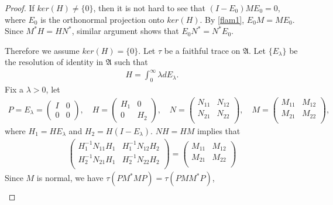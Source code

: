 \documentclass[a4paper,10pt]{amsart}
\newcommand{\AAA}{\mathfrak A}
\begin{document}
\begin{proof}
    If $ker(H) \neq \{0\}$, then it is not hard to see that 
    $(I-E_{0})ME_{0} = 0$, where $E_0$ is the orthonormal projection 
    onto $ker(H)$. 
    By \cref{flam1}, $E_{0}M = ME_{0}$. 
    Since $M^{*}H = HN^{*}$, similar argument shows
    that $E_{0}N^{*} = N^{*}E_{0}$.
    
    Therefore we assume $ker(H) = \{0\}$.
    Let $\tau$ be a faithful trace on $\AAA$.
    Let $\{ E_{\lambda} \}$ be the resolution of identity in $\AAA$ such that
    \begin{align*}
        H = \int_{0}^{\infty} \lambda d E_{\lambda}. 
    \end{align*}
Fix a $\lambda > 0$, let
\begin{align*}
    P = E_{\lambda} = \begin{pmatrix}
          I & 0\\
          0 & 0
      \end{pmatrix}, \quad 
   H = \begin{pmatrix}
       H_1 & 0\\
       0 & H_2
   \end{pmatrix}, \quad  
   N = \begin{pmatrix}
       N_{11} & N_{12}\\ 
       N_{21} & N_{22} \\
   \end{pmatrix}, \quad  
   M = \begin{pmatrix}
       M_{11} & M_{12}\\ 
       M_{21} & M_{22} \\
   \end{pmatrix},
\end{align*}
where $H_1 = HE_{\lambda}$ and $H_2 = H(I-E_{\lambda})$.
$NH = HM$ implies that
\begin{align*}
   \begin{pmatrix}
       H_{1}^{-1}N_{11}H_{1} & H_{1}^{-1}N_{12}H_{2}\\
       H_{2}^{-1}N_{21}H_{1} & H_{2}^{-1}N_{22}H_{2}\\
   \end{pmatrix} = 
   \begin{pmatrix}
       M_{11} & M_{12}\\ 
       M_{21} & M_{22} \\
   \end{pmatrix}
\end{align*}
Since $M$ is normal, we have $\tau(PM^{*}MP) = \tau(PMM^{*}P)$, 
\begin{align*}

\end{align*}
\end{proof}
\end{document}

